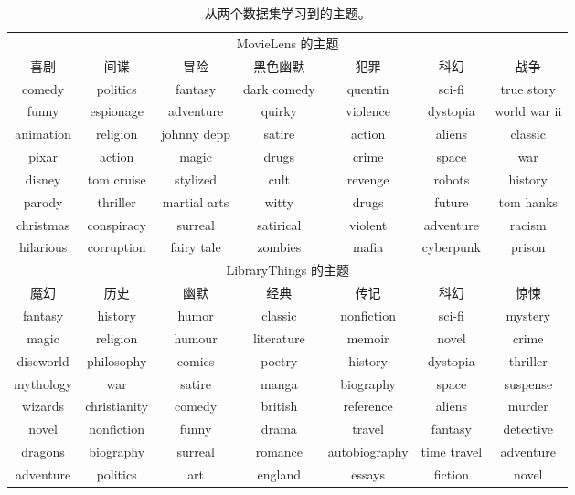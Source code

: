 \begin{table}[htbp]
\footnotesize
\centering
\caption{从两个数据集学习到的主题。}
\label{Topics}
\begin{tabular}[c]{ccccccc}
\hline
\hline
\multicolumn{7}{c}{MovieLens 的主题}                                                             \\
喜剧        & 间谍         & 冒险           & 黑色幽默        & 犯罪       & 科幻        & 战争           \\ \hline
comedy    & politics   & fantasy      & dark comedy & quentin  & sci-fi    & true story   \\ 
funny     & espionage  & adventure    & quirky      & violence & dystopia  & world war ii \\ 
animation & religion   & johnny depp  & satire      & action   & aliens    & classic      \\ 
pixar     & action     & magic        & drugs       & crime    & space     & war          \\ 
disney    & tom cruise & stylized     & cult        & revenge  & robots    & history      \\ 
parody    & thriller   & martial arts & witty       & drugs    & future    & tom hanks    \\ 
christmas & conspiracy & surreal      & satirical   & violent  & adventure & racism       \\ 
hilarious & corruption & fairy tale   & zombies     & mafia    & cyberpunk & prison       \\ \hline
\hline
\hline
\multicolumn{7}{c}{LibraryThings 的主题}                                                             \\ 
魔幻        & 历史         & 幽默           & 经典        & 传记       & 科幻        & 惊悚           \\ \hline
fantasy    & history   & humor      & classic & nonfiction  & sci-fi    & mystery   \\ 
magic     & religion  & humour    & literature      & memoir & novel  & crime \\ 
discworld & philosophy   & comics  & poetry      & history   & dystopia    & thriller      \\ 
mythology     & war     & satire        & manga       & biography    & space     & suspense          \\ 
wizards    & christianity & comedy     & british        & reference  & aliens    & murder      \\ 
novel    & nonfiction   & funny & drama       & travel    & fantasy    & detective    \\ 
dragons & biography & surreal      & romance   & autobiography  & time travel & adventure       \\ 
adventure & politics & art   & england     & essays    & fiction & novel       \\ \hline
\hline
\end{tabular}
\end{table}

